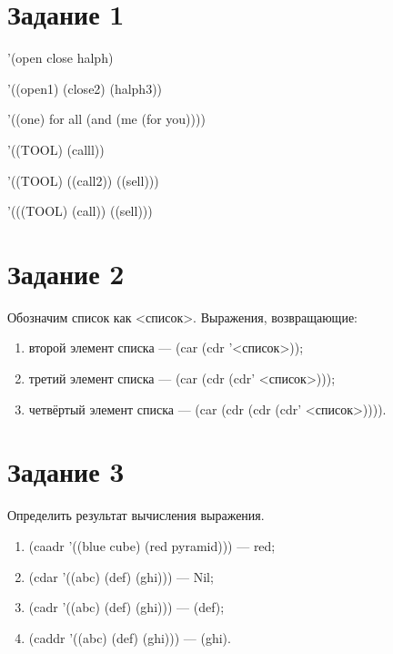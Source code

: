 \section{Задание 1}
'(open close halph)
\begin{figure}[H]
\end{figure}

'((open1) (close2) (halph3))
\begin{figure}[H]
\end{figure}

'((one) for all (and (me (for you))))
\begin{figure}[H]
\end{figure}

'((TOOL) (calll))
\begin{figure}[H]
\end{figure}
\newpage

'((TOOL) ((call2)) ((sell)))
\begin{figure}[H]
\end{figure}

'(((TOOL) (call)) ((sell)))
\begin{figure}[H]
\end{figure}

\section{Задание 2}
Обозначим список как <список>.
Выражения, возвращающие:
\begin{enumerate}
\item второй элемент списка --- (car (cdr '<список>));
\item третий элемент списка --- (car (cdr (cdr' <список>)));
\item четвёртый элемент списка --- (car (cdr (cdr (cdr' <список>)))).
\end{enumerate}

\section{Задание 3}
Определить результат вычисления выражения.
\begin{enumerate}
\item (caadr '((blue cube) (red pyramid))) --- red;
\item (cdar '((abc) (def) (ghi))) --- Nil;
\item (cadr '((abc) (def) (ghi))) --- (def);
\item (caddr '((abc) (def) (ghi))) --- (ghi).
\end{enumerate}
